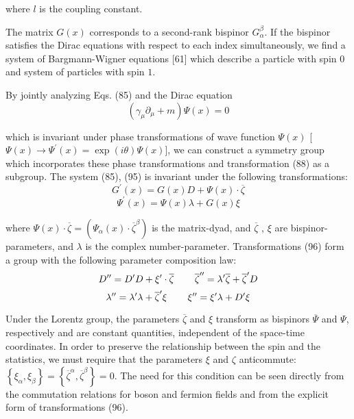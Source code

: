 \documentclass[a4paper,12pt]{article}
\begin{document}
where $l$ is the coupling constant.

The matrix $G(x)$ corresponds to a second-rank bispinor $G_\alpha ^\beta $.
If the bispinor satisfies the Dirac equations with respect to each index
simultaneously, we find a system of Bargmann-Wigner equations [61] which
describe a particle with spin $0$ and system of particles with spin $1$.

By jointly analyzing Eqs. (85) and the Dirac equation
\begin{equation}
\left( \gamma _\mu \partial _\mu +m\right) \Psi (x)=0  \label{95}
\end{equation}

which is invariant under phase transformations of wave function
$\Psi (x)$ [$ \Psi (x)\rightarrow \Psi ^{\prime }(x)=\exp (i\theta
)\Psi (x)$], we can construct a symmetry group which incorporates
these phase transformations and transformation (88) as a subgroup.
The system (85), (95) is invariant under the following
transformations:
\[
G^{\prime }(x)=G(x)D+\Psi (x)\cdot \overline{\zeta }
\]
\begin{equation}
\Psi ^{\prime }(x)=\Psi (x)\lambda +G(x)\xi  \label{96}
\end{equation}

where $\Psi (x)\cdot \overline{\zeta }=\left( \Psi _\alpha
(x)\cdot \overline{\zeta }^\beta \right) $ is the matrix-dyad, and
$\overline{\zeta }$ , $\xi $ are bispinor-parameters, and $\lambda
$ is the complex number-parameter. Transformations (96) form a
group with the following parameter composition law:
\[
D^{\prime \prime }=D^{\prime }D+\xi ^{\prime }\cdot
\overline{\zeta } \hspace{0.3in}\overline{\zeta }^{\prime \prime
}=\lambda ^{\prime }\overline{ \zeta }+\overline{\zeta }^{\prime
}D
\]
\begin{equation}
\lambda ^{\prime \prime }=\lambda ^{\prime }\lambda
+\overline{\zeta } ^{\prime }\xi \hspace{0.3in}\xi ^{\prime \prime
}=\xi ^{\prime }\lambda +D^{\prime }\xi  \label{97}
\end{equation}

Under the Lorentz group, the parameters $\overline{\zeta }$ and
$\xi $ transform as bispinors $\overline{\Psi }$ and $\Psi $,
respectively and are constant quantities, independent of the
space-time coordinates. In order to preserve the relationship
between the spin and the statistics, we must require that the
parameters $\xi $ and $\zeta $ anticommute: $\left\{ \xi _\alpha
,\xi _\beta \right\} =\left\{ \overline{\zeta }^\alpha ,\overline{
\zeta }^\beta \right\} =0$. The need for this condition can be
seen directly from the commutation relations for boson and fermion
fields and from the explicit form of transformations (96).
\end{document}
